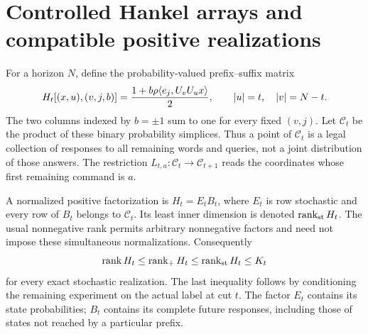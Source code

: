 \section{Controlled Hankel arrays and compatible positive realizations}\label{sec:hankel}
For a horizon $N$, define the probability-valued prefix--suffix matrix
\begin{equation}\label{eq:hankel}
 H_t[(x,u),(v,j,b)]
 =\frac{1+b\rho\langle e_j,U_vU_ux\rangle}2,
 \qquad |u|=t,\quad |v|=N-t.
\end{equation}
The two columns indexed by $b=\pm1$ sum to one for every fixed $(v,j)$.
Let $\mathcal C_t$ be the product of these binary probability simplices.
Thus a point of $\mathcal C_t$ is a legal collection of responses to all
remaining words and queries, not a joint distribution of those answers.
The restriction $L_{t,a}:\mathcal C_t\to\mathcal C_{t+1}$ reads the
coordinates whose first remaining command is $a$.

A normalized positive factorization is $H_t=E_tB_t$, where $E_t$ is
row stochastic and every row of $B_t$ belongs to $\mathcal C_t$.
Its least inner dimension is denoted $\operatorname{rank}_{\mathrm{st}}H_t$.
The usual nonnegative rank permits arbitrary nonnegative factors and
need not impose these simultaneous normalizations. Consequently
\begin{equation}\label{eq:rank-chain}
 \operatorname{rank} H_t\le\operatorname{rank}_+H_t\le\operatorname{rank}_{\mathrm{st}}H_t\le K_t
\end{equation}
for every exact stochastic realization. The last inequality follows by
conditioning the remaining experiment on the actual label at cut $t$.
The factor $E_t$ contains its state probabilities; $B_t$ contains its
complete future responses, including those of states not reached by a
particular prefix.

